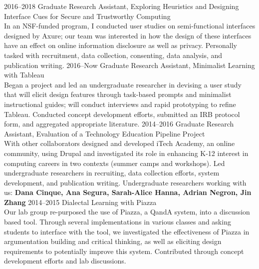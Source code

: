 \documentclass[]{cv-style}          %
\begin{document}
\begin{entrylist}
\entry
  {2016--2018}
  {Graduate Research Assistant, Exploring Heuristics and Designing Interface Cues for Secure and Trustworthy Computing}
  {}
  {\\
  In an NSF-funded program, I conducted user studies on semi-functional interfaces designed by Axure; our team was interested in how the design of these interfaces have an effect on online information disclosure as well as privacy. Personally tasked with recruitment, data collection, consenting, data analysis, and publication writing.}
\entry
  {2016--Now}
  {Graduate Research Assistant, Minimalist Learning with Tableau}
  {}
  {\\
  Began a project and led an undergraduate researcher in devising a user study that will elicit design features through task-based prompts and minimalist instructional guides; will conduct interviews and rapid prototyping to refine Tableau. Conducted concept development efforts, submitted an IRB protocol form, and aggregated appropriate literature.}
\entry
  {2014--2016}
  {Graduate Research Assistant, Evaluation of a Technology Education Pipeline Project}
  {}
  {\\
  With other collaborators designed and developed iTech Academy, an online community, using Drupal and investigated its role in enhancing K-12 interest in computing careers in two contexts (summer camps and workshops). Led undergraduate researchers in recruiting, data collection efforts, system development, and publication writing. Undergraduate researchers working with us: \textbf{Dana Cinque, Ana Segura, Sarah-Alice Hanna, Adrian Negron, Jin Zhang}}
\entry
  {2014--2015}
  {Dialectal Learning with Piazza}
  {}
  {\\
 Our lab group re-purposed the use of Piazza, a QandA system, into a discussion based tool. Through several implementations in various classes and asking students to interface with the tool, we investigated the effectiveness of Piazza in argumentation building and critical thinking, as well as eliciting design requirements to potentially improve this system. Contributed through concept development efforts and lab discussions.}

\end{entrylist}
\end{document}

